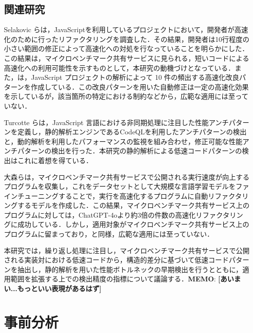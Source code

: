 \documentclass[submit,techrep,noauthor]{ipsj}
\newcommand{\memo}[1]{\colorbox{magenta!30}{{\bf MEMO}:}{\color{red!50} {\textbf{[#1]}}}}
\begin{document}


\subsection{関連研究}

Selakovic ら\cite{jsRefac}は，JavaScriptを利用しているプロジェクトにおいて，開発者が高速化のために行ったリファクタリングを調査した．その結果，開発者は10行程度の小さい範囲の修正によって高速化への対処を行なっていることを明らかにした．この結果は，マイクロベンチマーク共有サービスに見られる，短いコードによる高速化への利用可能性を示すものとして，本研究の動機づけとなっている．また，\cite{jsRefac}は，JavaScript プロジェクトの解析によって 10 件の頻出する高速化改良パターンを作成している．この改良パターンを用いた自動修正は一定の高速化効果を示しているが，該当箇所の特定における制約などから，広範な適用には至っていない．

Turcotte ら\cite{DrAsync}は，JavaScript 言語における非同期処理に注目した性能アンチパターンを定義し，静的解析エンジンであるCodeQL\cite{ql}を利用したアンチパターンの検出と，動的解析を利用したパフォーマンスの監視を組み合わせ，修正可能な性能アンチパターンの検出を行った．本研究の静的解析による低速コードパターンの検出はこれに着想を得ている．

大森ら\cite{omori}は，マイクロベンチマーク共有サービスで公開される実行速度が向上するプログラムを収集し，これをデータセットとして大規模な言語学習モデルをファインチューニングすることで，実行を高速化するプログラムに自動リファクタリングするモデルを作成した．この結果，マイクロベンチマーク共有サービス上のプログラムに対しては，ChatGPT-4oより約3倍の件数の高速化リファクタリングに成功している．しかし，適用対象がマイクロベンチマーク共有サービス上のプログラムに留まっており，\cite{jsRefac}と同様，広範な適用には至っていない．

本研究では，繰り返し処理に注目し，マイクロベンチマーク共有サービスで公開される実装対における低速コードから，構造的差分に基づいて低速コードパターンを抽出し，静的解析を用いた性能ボトルネックの早期検出を行うとともに，適用範囲を拡張する上での検出精度の指標について議論する．\memo{あいまい...もっといい表現があるはず}


\section{事前分析}
\label{sec:pre-analysis}
\end{document}
